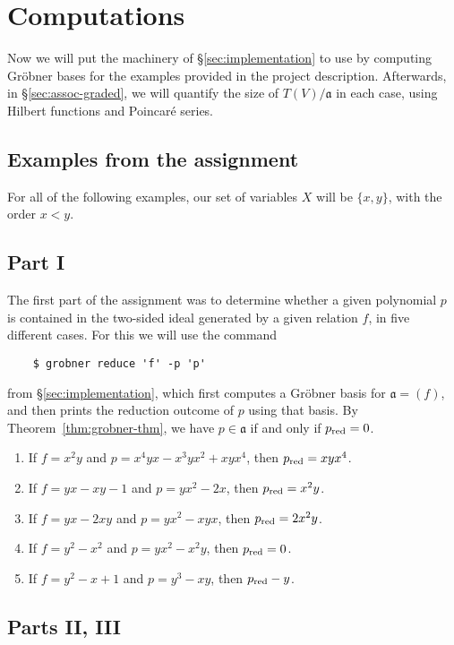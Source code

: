 \section{Computations}\label{sec:examples}
Now we will put the machinery of \S\ref{sec:implementation} to use by computing Gr\"obner bases for the examples provided in the project description. Afterwards, in \S\ref{sec:assoc-graded}, we will quantify the size of $T(V)/\mathfrak{a}$ in each case, using Hilbert functions and Poincar\'e series.

\subsection{Examples from the assignment}\label{sec:assignment-examples}
For all of the following examples, our set of variables $X$ will be $\{x,y\}$, with the order $x < y$.
\subsection*{Part I}

The first part of the assignment was to determine whether a given polynomial $p$ is contained in the two-sided ideal generated by a given relation $f$, in five different cases. For this we will use the command
\begin{verbatim}
	$ grobner reduce 'f' -p 'p'
\end{verbatim}
from \S\ref{sec:implementation}, which first computes a Gr\"obner basis for $\mathfrak{a} = (f)$, and then prints the reduction outcome of $p$ using that basis. By Theorem~\ref{thm:grobner-thm}, we have $p\in\mathfrak{a}$ if and only if $p_{\mathrm{red}}=0$.

\begin{enumerate}
	\item If $f = x^2y$ and $p = x^4 y x - x^3 y x^2 + xyx^4$, then $p_{\mathrm{red}} = xyx^4$.
	\item If $f = yx - xy - 1$ and $p = yx^2 - 2x$, then $p_{\mathrm{red}} = x^2 y$.
    \item If $f = yx - 2xy$ and $p = yx^2 - xyx$, then $p_{\mathrm{red}} = 2x^2y$.
    \item If $f = y^2 - x^2$ and $p = yx^2 - x^2y$, then $p_{\mathrm{red}} = 0$.
    \item If $f = y^2 - x + 1$ and $p=y^3 - xy$, then $p_{\mathrm{red}} - y$.
\end{enumerate}

\subsection*{Parts II, III}

